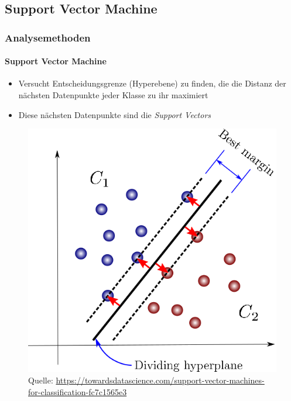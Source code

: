 \documentclass{beamer}
\newcommand*{\quelle}{%
	\footnotesize Quelle:
}
\begin{document}
\subsection{Support Vector Machine}
\begin{frame}
\frametitle{Analysemethoden}
\framesubtitle{Support Vector Machine}
\begin{itemize}\setlength\parskip{12pt}
\item Versucht Entscheidungsgrenze (Hyperebene) zu finden, die die Distanz der nächsten Datenpunkte jeder Klasse zu ihr maximiert
\item Diese nächsten Datenpunkte sind die \textit{Support Vectors}
\end{itemize}
\begin{figure}
	\centering
	\includegraphics[scale=0.25]{svm.png}\\
	\quelle\url{https://towardsdatascience.com/support-vector-machines-for-classification-fc7c1565e3}
\end{figure}
\end{frame}
\end{document}
